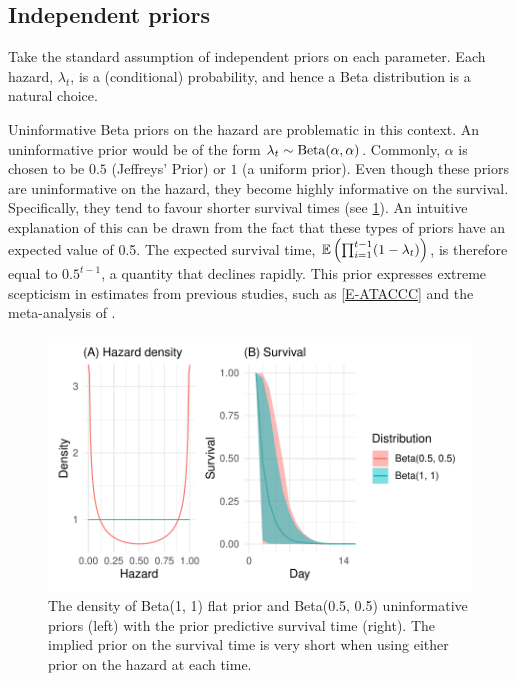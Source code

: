 \documentclass[thesis.tex]{subfiles}
\begin{document}
\subsection{Independent priors} \label{perf-test:sec:independent-priors}
Take the standard assumption of independent priors on each parameter.
Each hazard, $\lambda_t$, is a (conditional) probability, and hence a Beta distribution is a natural choice.

Uninformative Beta priors on the hazard are problematic in this context.
An uninformative prior would be of the form $\lambda_t \sim \operatorname{Beta}(\alpha, \alpha)$.
Commonly, $\alpha$ is chosen to be $0.5$ (Jeffreys' Prior) or $1$ (a uniform prior).
Even though these priors are uninformative on the hazard, they become highly informative on the survival. 
Specifically, they tend to favour shorter survival times (see \cref{perf-test:fig:flat-prior}).
An intuitive explanation of this can be drawn from the fact that these types of priors have an expected value of 0.5.
The expected survival time, $\operatorname{\mathbb{E}} \left( \prod_{i=1}^{t-1} (1-\lambda_t) \right)$, is therefore equal to $0.5^{t-1}$, a quantity that declines rapidly.
This prior expresses extreme scepticism in estimates from previous studies, such as \cref{E-ATACCC} and the meta-analysis of \textcite{cevikShedding}.
\begin{figure}
  \centering \includegraphics{cis-perfect-testing/flat-prior}
  \caption[Uninformative priors for the hazard]{The density of Beta(1, 1) flat prior and Beta(0.5, 0.5) uninformative priors (left) with the prior predictive survival time (right). The implied prior on the survival time is very short when using either prior on the hazard at each time. \label{perf-test:fig:flat-prior}}
\end{figure}
\end{document}
